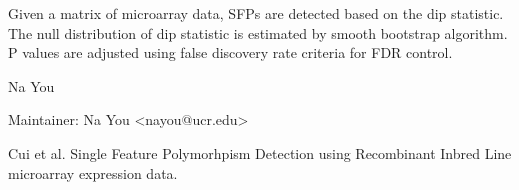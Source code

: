 \begin{Description}\relax
Given a matrix of microarray data, SFPs are detected based on the dip
statistic. The null distribution of dip statistic is 
estimated by smooth bootstrap algorithm. P values are adjusted using
false discovery rate criteria for FDR control.
\end{Description}
\begin{Details}\relax
{}
\end{Details}
\begin{Author}\relax
Na You

Maintainer: Na You \textless{}nayou@ucr.edu\textgreater{}
\end{Author}
\begin{References}\relax
Cui et al.
Single Feature Polymorhpism Detection using Recombinant Inbred Line
microarray expression data.
\end{References}

